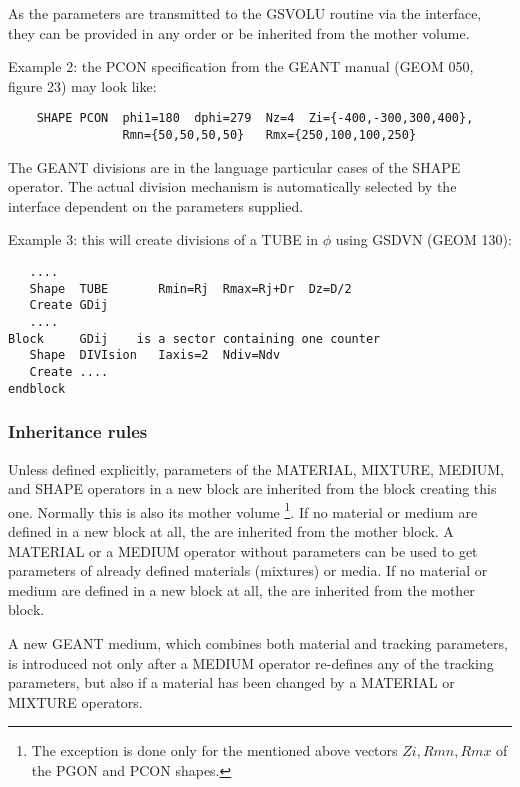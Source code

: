     As the parameters are transmitted to the GSVOLU routine 
via the \as interface, they can be provided 
in any order or be inherited from the mother volume.

\vspace{0.3cm} Example 2: the PCON specification from the GEANT manual
(GEOM 050, figure 23) may look like:
 
\begin{verbatim}
    SHAPE PCON  phi1=180  dphi=279  Nz=4  Zi={-400,-300,300,400},
                Rmn={50,50,50,50}   Rmx={250,100,100,250}
\end{verbatim}
 
The GEANT divisions are in the \g language particular cases of 
the SHAPE operator.
The actual division mechanism is automatically selected by the
\as interface dependent on the parameters supplied.
 
\vspace{0.3cm} Example 3: this will create divisions of a TUBE in 
$\phi$ using GSDVN (GEOM 130):
\begin{verbatim}
   ....
   Shape  TUBE       Rmin=Rj  Rmax=Rj+Dr  Dz=D/2
   Create GDij
   ....
Block     GDij    is a sector containing one counter
   Shape  DIVIsion   Iaxis=2  Ndiv=Ndv
   Create ....
endblock
\end{verbatim}
 
\subsubsection{Inheritance rules}

Unless defined explicitly,
parameters of the MATERIAL, MIXTURE, MEDIUM, and SHAPE operators
in a new block 
are inherited from the block creating this one.
Normally this is also its mother volume
\footnote{ The exception is done only for the mentioned above
vectors  $Zi, Rmn, Rmx$ of the PGON and PCON shapes.}.
If no material or medium are defined in a new block at all,
the are inherited from the mother block.
A MATERIAL or a MEDIUM operator without parameters
can be used to get parameters of already defined materials 
(mixtures) or media.
If no material or medium are defined in a new block at all,
the are inherited from the mother block.

A new GEANT medium, which combines both material and tracking parameters,
is introduced not only after a MEDIUM
operator re-defines any of the tracking parameters,
but also if a material has been changed by a MATERIAL or MIXTURE
operators.

